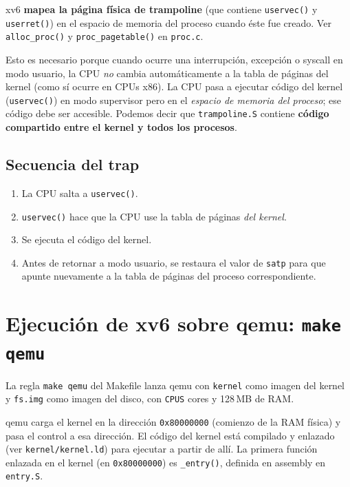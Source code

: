 \documentclass[11pt,a4paper]{article}
\begin{document}
xv6 \textbf{mapea la página física de trampoline} (que contiene
\texttt{uservec()} y \texttt{userret()}) en el espacio de memoria del
proceso cuando éste fue creado. Ver \texttt{alloc\_proc()} y
\texttt{proc\_pagetable()} en \texttt{proc.c}.

\begin{idea}
Esto es necesario porque cuando ocurre una interrupción, excepción o
syscall en modo usuario, la CPU \emph{no} cambia automáticamente a la
tabla de páginas del kernel (como sí ocurre en CPUs x86). La CPU pasa
a ejecutar código del kernel (\texttt{uservec()}) en modo supervisor
pero en el \emph{espacio de memoria del proceso}; ese código debe ser
accesible. Podemos decir que \texttt{trampoline.S} contiene
\textbf{código compartido entre el kernel y todos los procesos}.
\end{idea}

\subsection{Secuencia del trap}

\begin{enumerate}[leftmargin=*,nosep]
    \item La CPU salta a \texttt{uservec()}.
    \item \texttt{uservec()} hace que la CPU use la tabla de páginas
        \emph{del kernel}.
    \item Se ejecuta el código del kernel.
    \item Antes de retornar a modo usuario, se restaura el valor de
        \texttt{satp} para que apunte nuevamente a la tabla de
        páginas del proceso correspondiente.
\end{enumerate}

\section{Ejecución de xv6 sobre qemu: \texttt{make qemu}}

La regla \texttt{make qemu} del Makefile lanza qemu con
\texttt{kernel} como imagen del kernel y \texttt{fs.img} como imagen
del disco, con \verb|CPUS| cores y 128\,MB de RAM.

qemu carga el kernel en la dirección \texttt{0x80000000} (comienzo de
la RAM física) y pasa el control a esa dirección. El código del
kernel está compilado y enlazado (ver \texttt{kernel/kernel.ld}) para
ejecutar a partir de allí. La primera función enlazada en el kernel
(en \texttt{0x80000000}) es \texttt{\_entry()}, definida en assembly
en \texttt{entry.S}.
\end{document}
